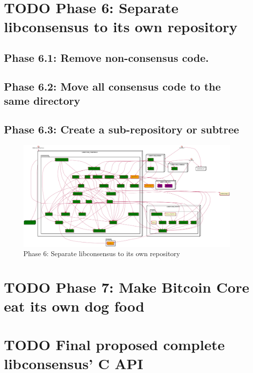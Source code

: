 \documentclass[11pt]{article}
\begin{document}
\newpage
\section{{\bfseries\sffamily TODO} Phase 6: Separate libconsensus to its own repository}
\label{sec-7}
\subsection{Phase 6.1: Remove non-consensus code.}
\label{sec-7-1}
\subsection{Phase 6.2: Move all consensus code to the same directory}
\label{sec-7-2}
\subsection{Phase 6.3: Create a sub-repository or subtree}
\label{sec-7-3}

\begin{figure}[htb]
\centering
\includegraphics[width=.9\linewidth]{./img/9_phase6_libconsensus.png}
\caption{\label{pic_9_phase6}Phase 6: Separate libconsensus to its own repository}
\end{figure}

\newpage
\section{{\bfseries\sffamily TODO} Phase 7: Make Bitcoin Core eat its own dog food}
\label{sec-8}
\newpage
\section{{\bfseries\sffamily TODO} Final proposed complete libconsensus' C API}
\label{sec-9}
\newpage
\end{document}

